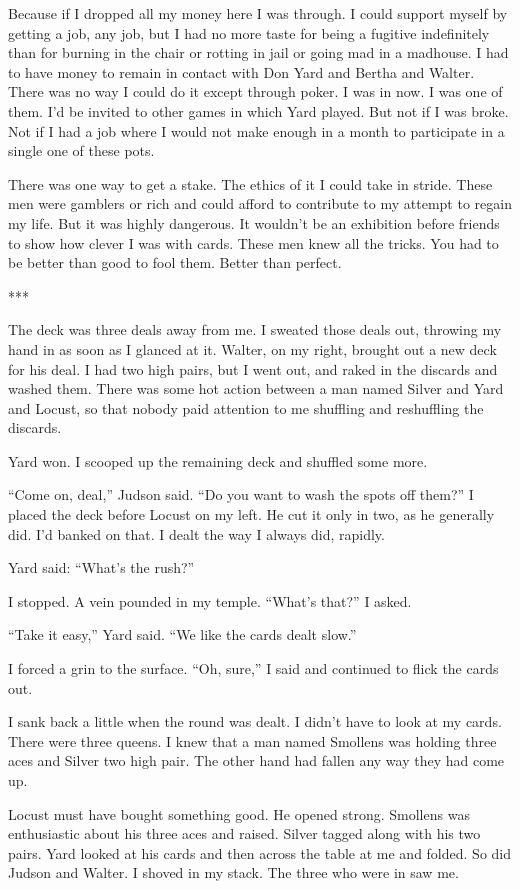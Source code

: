 \documentclass{novel}
\begin{document}
Because if I dropped all my money here I was through. I could support myself by getting a job, any job, but I had no more taste for being a fugitive indefinitely than for burning in the chair or rotting in jail or going mad in a madhouse. I had to have money to remain in contact with Don Yard and Bertha and Walter. There was no way I could do it except through poker. I was in now. I was one of them. I’d be invited to other games in which Yard played. But not if I was broke. Not if I had a job where I would not make enough in a month to participate in a single one of these pots.

There was one way to get a stake. The ethics of it I could take in stride. These men were gamblers or rich and could afford to contribute to my attempt to regain my life. But it was highly dangerous. It wouldn’t be an exhibition before friends to show how clever I was with cards. These men knew all the tricks. You had to be better than good to fool them. Better than perfect.

***

The deck was three deals away from me. I sweated those deals out, throwing my hand in as soon as I glanced at it. Walter, on my right, brought out a new deck for his deal. I had two high pairs, but I went out, and raked in the discards and washed them. There was some hot action between a man named Silver and Yard and Locust, so that nobody paid attention to me shuffling and reshuffling the discards.

Yard won. I scooped up the remaining deck and shuffled some more.

“Come on, deal,” Judson said. “Do you want to wash the spots off them?” I placed the deck before Locust on my left. He cut it only in two, as he generally did. I’d banked on that. I dealt the way I always did, rapidly.

Yard said: “What’s the rush?”

I stopped. A vein pounded in my temple. “What’s that?” I asked.

“Take it easy,” Yard said. “We like the cards dealt slow.”

I forced a grin to the surface. “Oh, sure,” I said and continued to flick the cards out.

I sank back a little when the round was dealt. I didn’t have to look at my cards. There were three queens. I knew that a man named Smollens was holding three aces and Silver two high pair. The other hand had fallen any way they had come up.

Locust must have bought something good. He opened strong. Smollens was enthusiastic about his three aces and raised. Silver tagged along with his two pairs. Yard looked at his cards and then across the table at me and folded. So did Judson and Walter. I shoved in my stack. The three who were in saw me.
\end{document}

